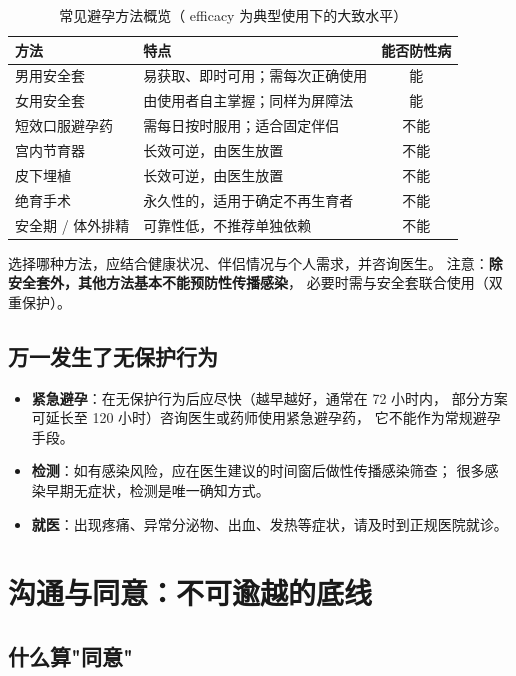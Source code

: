 \begin{table}[htbp]
  \centering
  \caption{常见避孕方法概览（ efficacy 为典型使用下的大致水平）}
  \begin{tabularx}{\textwidth}{@{}l X C@{}}
    \toprule
    \textbf{方法} & \textbf{特点} & \textbf{能否防性病} \\
    \midrule
    男用安全套   & 易获取、即时可用；需每次正确使用 & 能 \\
    女用安全套   & 由使用者自主掌握；同样为屏障法   & 能 \\
    短效口服避孕药 & 需每日按时服用；适合固定伴侣   & 不能 \\
    宫内节育器   & 长效可逆，由医生放置           & 不能 \\
    皮下埋植     & 长效可逆，由医生放置           & 不能 \\
    绝育手术     & 永久性的，适用于确定不再生育者 & 不能 \\
    安全期 / 体外排精 & 可靠性低，不推荐单独依赖 & 不能 \\
    \bottomrule
  \end{tabularx}
\end{table}

选择哪种方法，应结合健康状况、伴侣情况与个人需求，并咨询医生。
注意：\textbf{除安全套外，其他方法基本不能预防性传播感染}，
必要时需与安全套联合使用（双重保护）。

\section{万一发生了无保护行为}

\begin{itemize}
  \item \textbf{紧急避孕}：在无保护行为后应尽快（越早越好，通常在 72 小时内，
        部分方案可延长至 120 小时）咨询医生或药师使用紧急避孕药，
        它不能作为常规避孕手段。
  \item \textbf{检测}：如有感染风险，应在医生建议的时间窗后做性传播感染筛查；
        很多感染早期无症状，检测是唯一确知方式。
  \item \textbf{就医}：出现疼痛、异常分泌物、出血、发热等症状，请及时到正规医院就诊。
\end{itemize}

\chapter{沟通与同意：不可逾越的底线}

\section{什么算"同意"}

